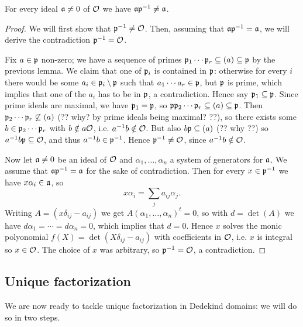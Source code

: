 \begin{lemma}
	For every ideal $\mathfrak{a}\neq 0$ of $\mathcal{O}$ we have $\mathfrak{a}\mathfrak{p}^{-1}\neq\mathfrak{a}$.
\end{lemma}
\begin{proof}
	We will first show that $\mathfrak{p}^{-1}\neq\mathcal{O}$. Then, assuming that $\mathfrak{a}\mathfrak{p}^{-1}=\mathfrak{a}$, we will derive the contradiction $\mathfrak{p}^{-1}=\mathcal{O}$.

	Fix $a\in\mathfrak{p}$ non-zero; we have a sequence of primes $\mathfrak{p}_1\cdots\mathfrak{p}_r\subseteq (a)\subseteq\mathfrak{p}$ by the previous lemma. We claim that one of $\mathfrak{p}_i$ is contained in $\mathfrak{p}$: otherwise for every $i$ there would be some $a_i\in\mathfrak{p}_i\setminus\mathfrak{p}$ such that $a_1\cdots a_r\in\mathfrak{p}$, but $\mathfrak{p}$ is prime, which implies that one of the $a_i$ has to be in $\mathfrak{p}$, a contradiction. Hence say $\mathfrak{p}_1\subseteq\mathfrak{p}$. Since prime ideals are maximal, we have $\mathfrak{p}_1=\mathfrak{p}$, so $\mathfrak{p}\mathfrak{p}_2\cdots\mathfrak{p}_r\subseteq(a)\subseteq\mathfrak{p}$. Then $\mathfrak{p}_2\cdots\mathfrak{p}_r\not\subseteq(a)$ (?? why? by prime ideals being maximal? ??), so there exists some $b\in\mathfrak{p}_2\cdots\mathfrak{p}_r$ with $b\notin a\mathcal{O}$, i.e. $a^{-1} b\notin\mathcal{O}$. But also $b\mathfrak{p}\subseteq(a)$ (?? why ??) so $a^{-1} b\mathfrak{p}\subseteq\mathcal{O}$, and thus $a^{-1} b\in\mathfrak{p}^{-1}$. Hence $\mathfrak{p}^{-1}\neq\mathcal{O}$, since $a^{-1} b\notin\mathcal{O}$.

	Now let $\mathfrak{a}\neq 0$ be an ideal of $\mathcal{O}$ and $\alpha_1,\dots,\alpha_n$ a system of generators for $\mathfrak{a}$. We assume that $\mathfrak{a}\mathfrak{p}^{-1}=\mathfrak{a}$ for the sake of contradiction. Then for every $x\in\mathfrak{p}^{-1}$ we have $x\alpha_i\in\mathfrak{a}$, so
	\[
		x\alpha_i = \sum_j a_{ij}\alpha_j.
	\]
	Writing $A=(x\delta_{ij} - a_{ij})$ we get $A(\alpha_1,\dots,\alpha_n)^t=0$, so with $d=\det(A)$ we have $d\alpha_1=\cdots=d\alpha_n=0$, which implies that $d=0$. Hence $x$ solves the monic polyonomial $f(X)=\det(X\delta_{ij}-a_{ij})$ with coefficients in $\mathcal{O}$, i.e. $x$ is integral so $x\in\mathcal{O}$. The choice of $x$ was arbitrary, so $\mathfrak{p}^{-1}=\mathcal{O}$, a contradiction.
	
\end{proof}

\subsection{Unique factorization}

We are now ready to tackle unique factorization in Dedekind domains: we will do so in two steps.


